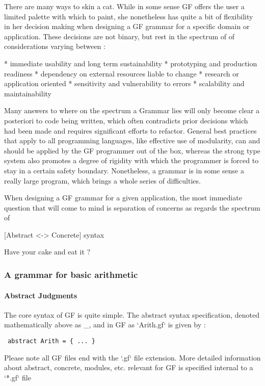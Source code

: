 There are many ways to skin a cat. While in some sense GF offers the user a
limited palette with which to paint, she nonetheless has quite a bit of
flexibility in her decision making when designing a GF grammar for a specific
domain or application. These decisions are not binary, but rest in the spectrum
of of considerations varying between :

* immediate usability and long term sustainability * prototyping and production
readiness * dependency on external resources liable to change * research or
application oriented * sensitivity and vulnerability to errors * scalability and
maintainability

Many answers to where on the spectrum a Grammar lies will only become clear a
posteriori to code being written, which often contradicts prior decisions which
had been made and requires significant efforts to refactor. General best
practices that apply to all programming languages, like effective use of
modularity, can and should be applied by the GF programmer out of the box,
whereas the strong type system also promotes a degree of rigidity with which the
programmer is forced to stay in a certain safety boundary. Nonetheless, a
grammar is in some sense a really large program, which brings a whole series of
difficulties.

When designing a GF grammar for a given application, the most immediate question
that will come to mind is separation of concerns as regards the spectrum of

[Abstract <-> Concrete] syntax

Have your cake and eat it ?

\subsubsection{A grammar for basic arithmetic}

\paragraph {Abstract Judgments}

The core syntax of GF is quite simple. The abstract syntax specification,
denoted mathematically above as _, and in GF as `Arith.gf` is given by :


\begin{verbatim} abstract Arith = { ... }
\end{verbatim}

Please note all GF files end with the `.gf` file extension. More detailed
information about abstract, concrete, modules, etc. relevant for GF is specified
internal to a `*.gf` file

